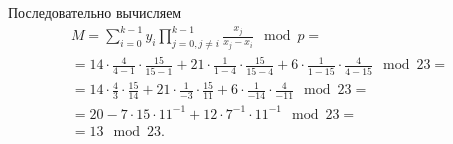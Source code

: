 Последовательно вычисляем
\[\begin{array}{l}
	M = \sum\limits_{i=0}^{k-1} y_i \prod\limits_{j=0, j \neq i}^{k-1} \frac{x_j}{x_j - x_i} \mod p = \\
	= 14 \cdot \frac{4}{4-1} \cdot \frac{15}{15-1} + 21 \cdot \frac{1}{1-4} \cdot \frac{15}{15-4} + 6 \cdot \frac{1}{1-15} \cdot \frac{4}{4-15} \mod 23 = \\
	= 14 \cdot \frac{4}{3} \cdot \frac{15}{14} + 21 \cdot \frac{1}{-3} \cdot \frac{15}{11} + 6 \cdot \frac{1}{-14} \cdot \frac{4}{-11} \mod 23 = \\
	= 20 - 7 \cdot 15 \cdot 11^{-1} + 12 \cdot 7^{-1} \cdot 11^{-1} \mod 23 = \\
	= 13 \mod 23. \\
\end{array}\]

\exampleend

